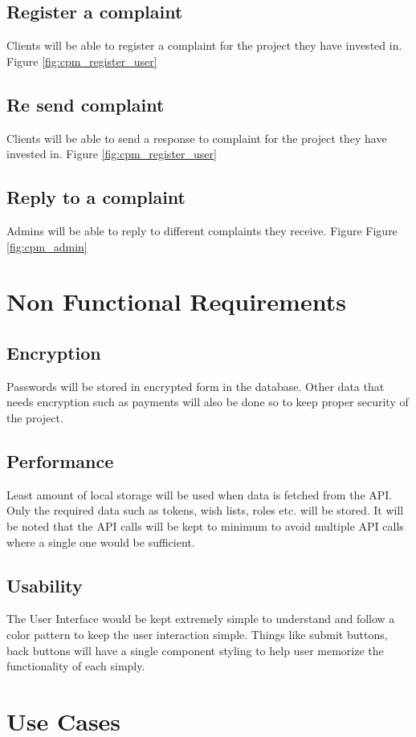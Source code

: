 \subsection{Register a complaint}
Clients will be able to register a complaint for the project they have invested in. Figure \ref{fig:cpm_register_user}
\subsection{Re send complaint}
Clients will be able to send a response to complaint for the project they have invested in. Figure \ref{fig:cpm_register_user}
\subsection{Reply to a complaint}
Admins will be able to reply to different complaints they receive. Figure Figure \ref{fig:cpm_admin}

\section{Non Functional Requirements}
\subsection{Encryption}
Passwords will be stored in encrypted form in the database. Other data that needs encryption such as payments will also be done so to keep proper security of the project.
\subsection{Performance}
Least amount of local storage will be used when data is fetched from the API. Only the required data such as tokens, wish lists, roles etc. will be stored. It will be noted that the API calls will be kept to minimum to avoid multiple API calls where a single one would be sufficient.
\subsection{Usability}
The User Interface would be kept extremely simple to understand and follow a color pattern to keep the user interaction simple. Things like submit buttons, back buttons will have a single component styling to help user memorize the functionality of each simply.

\newpage
\section{Use Cases}
